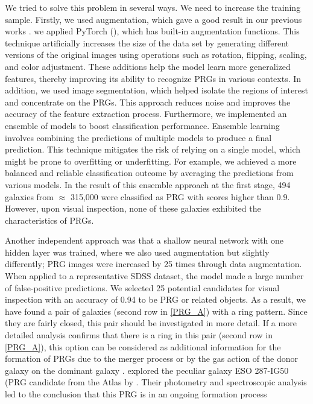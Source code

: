 \documentclass{aa}
\begin{document}
We tried to solve this problem in several ways. We need to increase the training sample. Firstly, we used augmentation, which gave a good result in our previous works \citep{Khramtsov2022}. we applied PyTorch (\cite{Paszke2019}), which has built-in augmentation functions. This technique artificially increases the size of the data set by generating different versions of the original images using operations such as rotation, flipping, scaling, and color adjustment. These additions help the model learn more generalized features, thereby improving its ability to recognize PRGs in various contexts. In addition, we used image segmentation, which helped isolate the regions of interest and concentrate on the PRGs. This approach reduces noise and improves the accuracy of the feature extraction process. Furthermore, we implemented an ensemble of models to boost classification performance. Ensemble learning involves combining the predictions of multiple models to produce a final prediction. This technique mitigates the risk of relying on a single model, which might be prone to overfitting or underfitting. For example, we achieved a more balanced and reliable classification outcome by averaging the predictions from various models. In the result of this ensemble approach at the first stage, 494 galaxies from $\approx$ 315,000 were classified as PRG with scores higher than 0.9. However, upon visual inspection, none of these galaxies exhibited the characteristics of PRGs.

Another independent approach was that a shallow neural network with one hidden layer was trained, where we also used augmentation but slightly differently; PRG images were increased by 25 times through data augmentation. When applied to a representative SDSS dataset, the model made a large number of false-positive predictions. We selected 25 potential candidates for visual inspection with an accuracy of 0.94 to be PRG or related objects. As a result, we have found a pair of galaxies (second row in \autoref{PRG_A}) with a ring pattern. Since they are fairly closed, this pair should be investigated in more detail. If a more detailed analysis confirms that there is a ring in this pair (second row in \autoref{PRG_A}), this option can be considered as additional information for the formation of PRGs due to the merger process \citep{Schweizer1983, Bekki1997, Bekki1998, Akhil2024b} or by the gas action of the donor galaxy on the dominant galaxy \cite{Bournaud2003, Ordenes2016}. 
\cite{Freitas2024} explored the peculiar galaxy ESO 287-IG50 (PRG candidate from the Atlas by \cite{Whitmore1990}. Their photometry and spectroscopic analysis led to the conclusion that this PRG is in an ongoing formation process
\end{document}

